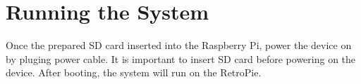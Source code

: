 \section{Running the System}
\label{sec:running_system}
Once the prepared SD card inserted into the Raspberry Pi, power the device on by pluging power cable. It is important to insert SD card before powering on the device. After booting, the system will run on the RetroPie.
